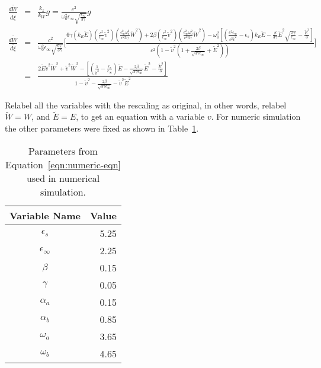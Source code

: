 \documentclass{article}[12pt]
\theoremstyle{plain}
\begin{document}
\begin{eqnarray}
\frac{d\widetilde{W}}{d\widetilde{\xi}}  & = & \frac{k_z}{k_W} g = \frac{c^2}{\omega_0^2 \epsilon_\infty \sqrt{\frac{\epsilon_\infty}{3\gamma}}} g \nonumber \\
\frac{d\widetilde{W}}{d\widetilde{\xi}} & = & \frac{c^2}{\omega_0^2 \epsilon_\infty \sqrt{\frac{\epsilon_\infty}{3\gamma}}}
\Big[\frac{6\gamma (k_E \widetilde{E})(\frac{c^2}{\epsilon_\infty}\widetilde{v}^2)(\frac{\epsilon^2_\infty \omega_0^2}{c^2 3\gamma} \widetilde{W}^2)
+ 2\beta (\frac{c^2}{\epsilon_\infty}\widetilde{v}^2)(\frac{\epsilon^2_\infty \omega_0^2}{c^2 3\gamma} \widetilde{W}^2)
- \omega_0^2[ ( \frac{c^2 \epsilon_\infty}{c^2\widetilde{v}^2} - \epsilon_s)k_E\widetilde{E} - \frac{\beta}{3\gamma} \widetilde{E}^2 \sqrt{\frac{3\gamma}{\epsilon_\infty}} - \frac{\widetilde{E}^3}{3}]}
{c^2(1-\widetilde{v}^2(1+\frac{2\beta}{\sqrt{3\gamma \epsilon_\infty}} + \widetilde{E}^2))}\Big] \nonumber \\
& = & \frac{2\widetilde{E}\widetilde{v}^2\widetilde{W}^2 + \widetilde{v}^2\widetilde{W}^2 - [(\frac{1}{\widetilde{v}^2} - \frac{\epsilon_s}{\epsilon_\infty})\widetilde{E} - 
\frac{2\beta}{\sqrt{3\gamma \epsilon_\infty}} \widetilde{E}^2 - \frac{\widetilde{E}^3}{3}]}
{1-\widetilde{v}^2 - \frac{2\beta}{\sqrt{3\gamma \epsilon_\infty}} - \widetilde{v}^2\widetilde{E}^2} \label{eqn:numeric-eqn}
\end{eqnarray}

Relabel all the variables with the rescaling as original, in other words, relabel $\widetilde{W}=W$, and $\widetilde{E}=E$, to get
an equation with a variable $v$. For numeric simulation the other parameters were fixed as shown in Table~\ref{tab:params}.
\begin{table}
\begin{center}
\begin{tabular}{cr}
\hline
Variable Name & Value \\
\hline
\hline
$\epsilon_s$ & 5.25 \\
$\epsilon_\infty$ & 2.25 \\
$\beta$ & 0.15 \\
$\gamma$ & 0.05 \\
$\alpha_a$ & 0.15 \\
$\alpha_b$ & 0.85 \\
$\omega_a$ & 3.65 \\
$\omega_b$ & 4.65 \\
\hline
\end{tabular}
\caption{Parameters from Equation~\ref{eqn:numeric-eqn} used in numerical simulation.}
\label{tab:params}
\end{center}
\end{table}
\end{document}
